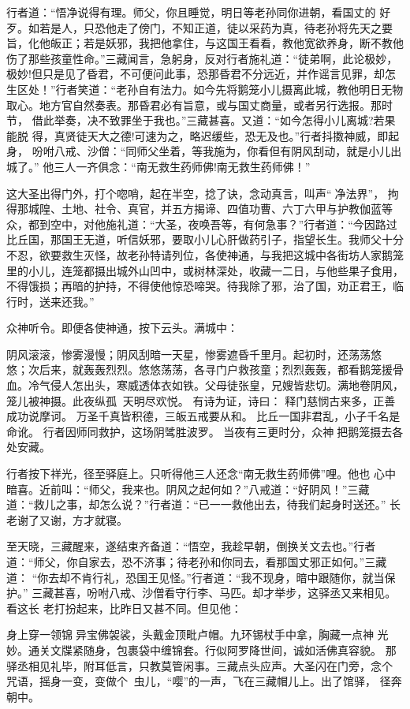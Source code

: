 行者道：“悟净说得有理。师父，你且睡觉，明日等老孙同你进朝，看国丈的
好歹。如若是人，只恐他走了傍门，不知正道，徒以采药为真，待老孙将先天之要
旨，化他皈正；若是妖邪，我把他拿住，与这国王看看，教他宽欲养身，断不教他
伤了那些孩童性命。”三藏闻言，急躬身，反对行者施礼道：“徒弟啊，此论极妙，
极妙!但只是见了昏君，不可便问此事，恐那昏君不分远近，并作谣言见罪，却怎
生区处！”行者笑道：“老孙自有法力。如今先将鹅笼小儿摄离此城，教他明日无物
取心。地方官自然奏表。那昏君必有旨意，或与国丈商量，或者另行选报。那时节，
借此举奏，决不致罪坐于我也。”三藏甚喜。又道：“如今怎得小儿离城?若果能脱
得，真贤徒天大之德!可速为之，略迟缓些，恐无及也。”行者抖擞神威，即起身，
吩咐八戒、沙僧：“同师父坐着，等我施为，你看但有阴风刮动，就是小儿出城了。”
他三人一齐俱念：“南无救生药师佛!南无救生药师佛！”

这大圣出得门外，打个唿哨，起在半空，捻了诀，念动真言，叫声“净法界”，
拘得那城隍、土地、社令、真官，并五方揭谛、四值功曹、六丁六甲与护教伽蓝等
众，都到空中，对他施礼道：“大圣，夜唤吾等，有何急事？”行者道：“今因路过
比丘国，那国王无道，听信妖邪，要取小儿心肝做药引子，指望长生。我师父十分
不忍，欲要救生灭怪，故老孙特请列位，各使神通，与我把这城中各街坊人家鹅笼
里的小儿，连笼都摄出城外山凹中，或树林深处，收藏一二日，与他些果子食用，
不得饿损；再暗的护持，不得使他惊恐啼哭。待我除了邪，治了国，劝正君王，临
行时，送来还我。”

众神听令。即便各使神通，按下云头。满城中：

阴风滚滚，惨雾漫慢；阴风刮暗一天星，惨雾遮昏千里月。起初时，还荡荡悠
悠；次后来，就轰轰烈烈。悠悠荡荡，各寻门户救孩童；烈烈轰轰，都看鹅笼援骨
血。冷气侵人怎出头，寒威透体衣如铁。父母徒张皇，兄嫂皆悲切。满地卷阴风，
笼儿被神摄。此夜纵孤，天明尽欢悦。
有诗为证，诗曰：
释门慈悯古来多，正善成功说摩诃。
万圣千真皆积德，三皈五戒要从和。
比丘一国非君乱，小子千名是命讹。
行者因师同救护，这场阴骘胜波罗。
当夜有三更时分，众神把鹅笼摄去各处安藏。

行者按下祥光，径至驿庭上。只听得他三人还念“南无救生药师佛”哩。他也
心中暗喜。近前叫：“师父，我来也。阴风之起何如？”八戒道：“好阴风！”三藏
道：“救儿之事，却怎么说？”行者道：“已一一救他出去，待我们起身时送还。”
长老谢了又谢，方才就寝。

至天晓，三藏醒来，遂结束齐备道：“悟空，我趁早朝，倒换关文去也。”行者
道：“师父，你自家去，恐不济事；待老孙和你同去，看那国丈邪正如何。”三藏道：
“你去却不肯行礼，恐国王见怪。”行者道：“我不现身，暗中跟随你，就当保护。”
三藏甚喜，吩咐八戒、沙僧看守行李、马匹。却才举步，这驿丞又来相见。看这长
老打扮起来，比昨日又甚不同。但见他：

身上穿一领锦异宝佛袈裟，头戴金顶毗卢帽。九环锡杖手中拿，胸藏一点神
光妙。通关文牒紧随身，包裹袋中缠锦套。行似阿罗降世间，诚如活佛真容貌。
那驿丞相见礼毕，附耳低言，只教莫管闲事。三藏点头应声。大圣闪在门旁，念个
咒语，摇身一变，变做个虫儿，“嘤”的一声，飞在三藏帽儿上。出了馆驿，
径奔朝中。

